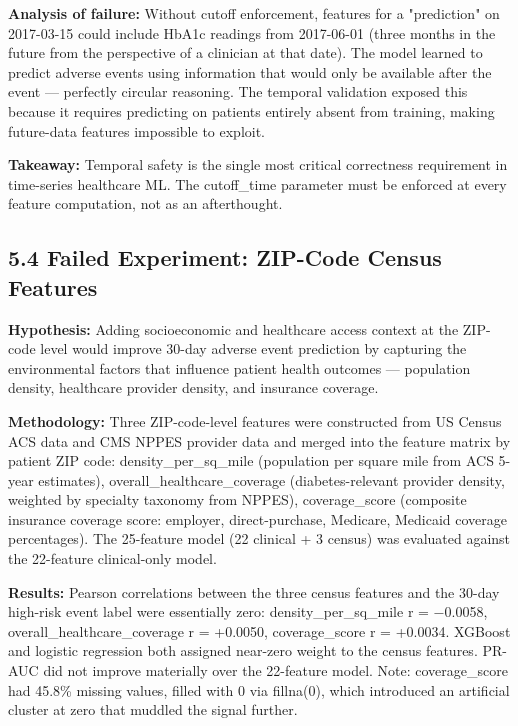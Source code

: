 \documentclass[11pt,a4paper]{article}
\begin{document}
\textbf{Analysis of failure:} Without cutoff enforcement, features for a "prediction" on 2017-03-15 could include HbA1c readings from 2017-06-01 (three months in the future from the perspective of a clinician at that date). The model learned to predict adverse events using information that would only be available after the event --- perfectly circular reasoning. The temporal validation exposed this because it requires predicting on patients entirely absent from training, making future-data features impossible to exploit.

\textbf{Takeaway:} Temporal safety is the single most critical correctness requirement in time-series healthcare ML. The cutoff\_time parameter must be enforced at every feature computation, not as an afterthought.

\subsection{5.4 Failed Experiment: ZIP-Code Census Features}

\textbf{Hypothesis:} Adding socioeconomic and healthcare access context at the ZIP-code level would improve 30-day adverse event prediction by capturing the environmental factors that influence patient health outcomes --- population density, healthcare provider density, and insurance coverage.

\textbf{Methodology:} Three ZIP-code-level features were constructed from US Census ACS data and CMS NPPES provider data and merged into the feature matrix by patient ZIP code: density\_per\_sq\_mile (population per square mile from ACS 5-year estimates), overall\_healthcare\_coverage (diabetes-relevant provider density, weighted by specialty taxonomy from NPPES), coverage\_score (composite insurance coverage score: employer, direct-purchase, Medicare, Medicaid coverage percentages). The 25-feature model (22 clinical + 3 census) was evaluated against the 22-feature clinical-only model.

\textbf{Results:} Pearson correlations between the three census features and the 30-day high-risk event label were essentially zero: density\_per\_sq\_mile r = $-$0.0058, overall\_healthcare\_coverage r = +0.0050, coverage\_score r = +0.0034. XGBoost and logistic regression both assigned near-zero weight to the census features. PR-AUC did not improve materially over the 22-feature model. Note: coverage\_score had 45.8\% missing values, filled with 0 via fillna(0), which introduced an artificial cluster at zero that muddled the signal further.
\end{document}
